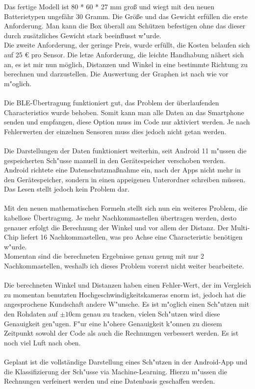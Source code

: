 
Das fertige Modell ist 80 * 60 * 27 mm groß und wiegt mit den 
neuen Batterietypen ungefähr 30 Gramm. Die Größe und das Gewicht 
erfüllen die erste Anforderung. Man kann die Box überall am 
Schützen befestigen ohne das dieser durch zusätzliches Gewicht 
stark beeinflusst w"urde.\\
Die zweite Anforderung, der geringe Preis, wurde erfüllt, die
Kosten belaufen sich auf 25 \euro{} pro Sensor. Die letze Anforderung,
die leichte Handhabung nähert sich an, es ist mir nun möglich, Distanzen
und Winkel in eine bestimmte Richtung zu berechnen und darzustellen.
Die Auswertung der Graphen ist nach wie vor m"oglich.\\
\\
Die BLE-Übertragung funktioniert gut, das Problem der überlaufenden
Characteristics wurde behoben. Somit kann man alle Daten an das 
Smartphone senden und empfangen, diese Option muss im Code nur 
aktiviert werden. Je nach Fehlerwerten der einzelnen Sensoren muss dies 
jedoch nicht getan werden.\\
\\
Die Darstellungen der Daten funktioniert weiterhin, seit Android 11
m"ussen die gespeicherten Sch"usse manuell in den Gerätespeicher 
verschoben werden. Android richtete eine Datenschutzmaßnahme ein, 
nach der Apps nicht mehr in den Gerätespeicher, sondern in einen
appeigenen Unterordner schreiben müssen. Das Lesen stellt jedoch
kein Problem dar.\\
\\
Mit den neuen mathematischen Formeln stellt sich nun ein weiteres
Problem, die kabellose Übertragung. Je mehr Nachkommastellen übertragen
werden, desto genauer erfolgt die Berechnung der Winkel und vor allem 
der Distanz. Der Multi-Chip liefert 16 Nachkommastellen, was pro Achse
eine Characteristic benötigen w"urde.\\
Momentan sind die berechneten Ergebnisse genau genug mit nur 2 
Nachkommastellen, weshalb ich dieses Problem vorerst nicht weiter bearbeitete.\\
\\
Die berechneten Winkel und Distanzen haben einen Fehler-Wert, der im Vergleich
zu momentan benutzten Hochgeschwindigkeitskameras enorm ist, jedoch 
hat die angesprochene Kundschaft andere W"unsche. Es ist m"oglich 
einen Sch"utzen mit den Rohdaten auf $\pm10$cm genau zu tracken, vielen
Sch"utzen wird diese Genauigkeit gen"ugen. F"ur eine h"ohere Genauigkeit 
k"onnen zu diesem Zeitpunkt sowohl der Code als auch die Rechnungen verbessert 
werden. Es ist noch viel Luft nach oben.\\
\\
Geplant ist die vollständige Darstellung eines Sch"utzen in der Android-App
und die Klassifizierung der Sch"usse via Machine-Learning. Hierzu m"ussen
die Rechnungen verfeinert werden und eine Datenbasis geschaffen werden.